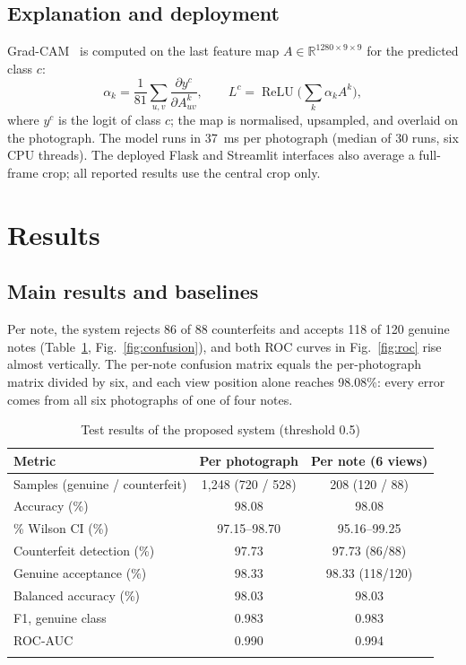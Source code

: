 \documentclass[pdflatex,sn-mathphys-num]{sn-jnl}
\begin{document}
\subsection{Explanation and deployment}\label{sec:deploy}

Grad-CAM~\cite{selvaraju2017gradcam} is computed on the last feature map
$A\in\mathbb{R}^{1280\times9\times9}$ for the predicted class $c$:
\begin{equation}
\alpha_k = \frac{1}{81}\sum_{u,v}\frac{\partial y^{c}}{\partial A^{k}_{uv}},\qquad
L^{c} = \operatorname{ReLU}\!\Big(\sum_{k}\alpha_k A^{k}\Big),
\label{eq:gradcam}
\end{equation}
where $y^c$ is the logit of class $c$; the map is normalised, upsampled, and overlaid on
the photograph. The model runs in 37~ms per photograph (median of 30 runs, six CPU
threads). The deployed Flask and Streamlit interfaces also average a full-frame crop;
all reported results use the central crop only.

\section{Results}\label{sec:results}

\subsection{Main results and baselines}\label{sec:main}

Per note, the system rejects 86 of 88 counterfeits and accepts 118 of 120 genuine notes
(Table~\ref{tab:main}, Fig.~\ref{fig:confusion}), and both ROC curves in
Fig.~\ref{fig:roc} rise almost vertically. The per-note confusion matrix equals the
per-photograph matrix divided by six, and each view position alone reaches 98.08\%:
every error comes from all six photographs of one of four notes.

\begin{table}[!t]
\caption{Test results of the proposed system (threshold 0.5)}\label{tab:main}
\begin{tabular*}{\textwidth}{@{\extracolsep\fill}lcc}
\toprule
Metric & Per photograph & Per note (6 views) \\
\midrule
Samples (genuine / counterfeit) & 1{,}248 (720 / 528) & 208 (120 / 88) \\
Accuracy (\%) & 98.08 & 98.08 \\
\quad 95\% Wilson CI (\%) & 97.15--98.70 & 95.16--99.25 \\
Counterfeit detection (\%) & 97.73 & 97.73 (86/88) \\
Genuine acceptance (\%) & 98.33 & 98.33 (118/120) \\
Balanced accuracy (\%) & 98.03 & 98.03 \\
F1, genuine class & 0.983 & 0.983 \\
ROC-AUC & 0.990 & 0.994 \\
\botrule
\end{tabular*}
\end{table}
\end{document}
